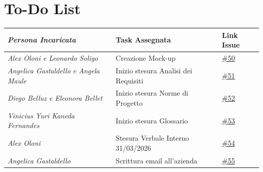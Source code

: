\documentclass[a4paper,12pt]{article}
\begin{document}
\section{To-Do List}
\begin{table}[h]
    \centering
    \begin{tabular}{|p{4.5cm}|p{5cm}|l|}
    \hline
        \rowcolor{lightgray}\textit{\textbf{Persona Incaricata}}  & \textbf{Task Assegnata} &\textbf{Link Issue} \\
    \hline
        \textit {Alex Oloni e Leonardo Soligo} & Creazione Mock-up & \href{https://github.com/aLittleByte-19/Documentazione/issues/50}{\#50}\\
    \hline
         \textit {Angelica Gastaldello e Angela Maule} & Inizio stesura Analisi dei Requisiti& \href{https://github.com/aLittleByte-19/Documentazione/issues/51}{\#51}\\
    \hline
        \textit{Diego Belluz e Eleonora Bellet} &  Inizio stesura Norme di Progetto& \href{https://github.com/aLittleByte-19/Documentazione/issues/52}{\#52}\\
    \hline
        \textit{Vinicius Yuri Kaneda Fernandes} & Inizio stesura Glossario & \href{https://github.com/aLittleByte-19/Documentazione/issues/53}{\#53}\\
    \hline
        \textit{Alex Oloni} & Stesura Verbale Interno 31/03/2026 & \href{https://github.com/aLittleByte-19/Documentazione/issues/54}{\#54}\\
    \hline
        \textit {Angelica Gastaldello}  &  Scrittura email all'azienda & \href{https://github.com/aLittleByte-19/Documentazione/issues/55}{\#55}\\
    \hline
    \end{tabular}
    \label{tab:placeholder}
\end{table}
\end{document}
